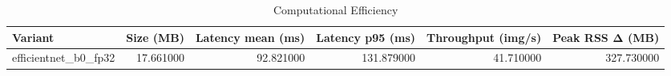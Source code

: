 \begin{table}
\caption{Computational Efficiency}
\label{tab:efficiency}
\begin{tabular}{lrrrrr}
\toprule
Variant & Size (MB) & Latency mean (ms) & Latency p95 (ms) & Throughput (img/s) & Peak RSS Δ (MB) \\
\midrule
efficientnet\_b0\_fp32 & 17.661000 & 92.821000 & 131.879000 & 41.710000 & 327.730000 \\
\bottomrule
\end{tabular}
\end{table}
